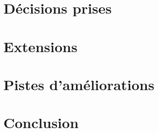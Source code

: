 \documentclass[12pt,a4paper]{article}
\begin{document}
\section{Décisions prises}
\section{Extensions}
\section{Pistes d'améliorations}
\section{Conclusion}
\end{document}
